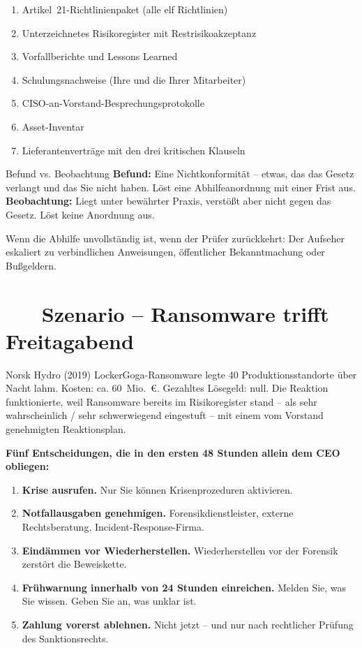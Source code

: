 \documentclass[11pt,a4paper,twoside]{book}
\newcommand{\lessontag}[1]{%
  \texorpdfstring{%
    \setlength{\fboxsep}{3pt}\colorbox{nisd2blue}{\textcolor{white}{\footnotesize\bfseries #1}}\quad%
  }{Lektion #1\ }%
}
\begin{document}
\begin{enumerate}
  \item Artikel~21-Richtlinienpaket (alle elf Richtlinien)
  \item Unterzeichnetes Risikoregister mit Restrisikoakzeptanz
  \item Vorfallberichte und Lessons Learned
  \item Schulungsnachweise (Ihre und die Ihrer Mitarbeiter)
  \item CISO-an-Vorstand-Besprechungsprotokolle
  \item Asset-Inventar
  \item Lieferantenverträge mit den drei kritischen Klauseln
\end{enumerate}

\begin{definitionbox}{Befund vs. Beobachtung}
\textbf{Befund:} Eine Nichtkonformität -- etwas, das das Gesetz verlangt und das Sie nicht haben. Löst eine Abhilfeanordnung mit einer Frist aus. \\
\textbf{Beobachtung:} Liegt unter bewährter Praxis, verstößt aber nicht gegen das Gesetz. Löst keine Anordnung aus.
\end{definitionbox}

Wenn die Abhilfe unvollständig ist, wenn der Prüfer zurückkehrt: Der Aufseher eskaliert zu verbindlichen Anweisungen, öffentlicher Bekanntmachung oder Bußgeldern.

\section{\lessontag{3.8}Szenario -- Ransomware trifft Freitagabend}

\begin{casestudy}{Norsk Hydro (2019)}
LockerGoga-Ransomware legte 40 Produktionsstandorte über Nacht lahm. Kosten: ca. 60~Mio.~\euro{}. Gezahltes Lösegeld: null. Die Reaktion funktionierte, weil Ransomware bereits im Risikoregister stand -- als sehr wahrscheinlich / sehr schwerwiegend eingestuft -- mit einem vom Vorstand genehmigten Reaktionsplan.
\end{casestudy}

\textbf{Fünf Entscheidungen, die in den ersten 48 Stunden allein dem CEO obliegen:}

\begin{enumerate}
  \item \textbf{Krise ausrufen.} Nur Sie können Krisenprozeduren aktivieren.
  \item \textbf{Notfallausgaben genehmigen.} Forensikdienstleister, externe Rechtsberatung, Incident-Response-Firma.
  \item \textbf{Eindämmen vor Wiederherstellen.} Wiederherstellen vor der Forensik zerstört die Beweiskette.
  \item \textbf{Frühwarnung innerhalb von 24 Stunden einreichen.} Melden Sie, was Sie wissen. Geben Sie an, was unklar ist.
  \item \textbf{Zahlung vorerst ablehnen.} Nicht jetzt -- und nur nach rechtlicher Prüfung des Sanktionsrechts.
\end{enumerate}
\end{document}
